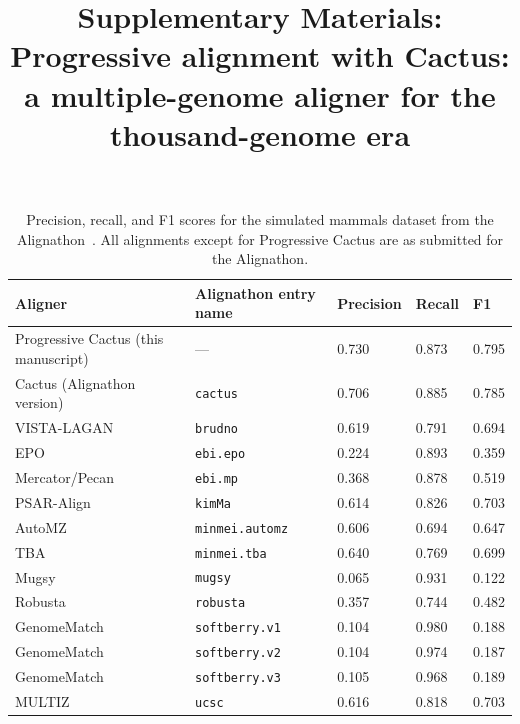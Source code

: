 \documentclass{article}
\newcommand{\beginsupplement}{%
        \setcounter{table}{0}
        \renewcommand{\thetable}{S\arabic{table}}%
        \setcounter{figure}{0}
        \renewcommand{\thefigure}{S\arabic{figure}}%
        \setcounter{algorithm}{0}
        \renewcommand{\thealgorithm}{S\arabic{algorithm}}%
        \setcounter{section}{0}
        \renewcommand{\thesection}{S\arabic{section}}%
}
\begin{document}
\beginsupplement
\title{Supplementary Materials: Progressive alignment with Cactus: a multiple-genome aligner for the thousand-genome era}
\author{}
\maketitle


\begin{table}
\begin{center}
\begin{tabular}{l|l|l|l|l}
Aligner	& Alignathon entry name & Precision	& Recall	& F1 \\
\midrule
Progressive Cactus (this manuscript) & --- & 0.730	& 0.873	& 0.795 \\
Cactus (Alignathon version) & \texttt{cactus} & 0.706	& 0.885	& 0.785 \\
VISTA-LAGAN~\cite{vistaLagan} & \texttt{brudno}	& 0.619	& 0.791	& 0.694\\
EPO~\cite{enredoPecan} & \texttt{ebi.epo} &	0.224 &	0.893 &	0.359 \\
Mercator/Pecan~\cite{mercator,pecan} & \texttt{ebi.mp} &	0.368 &	0.878 &	0.519 \\
PSAR-Align~\cite{psarAlign} & \texttt{kimMa}	& 0.614	& 0.826	& 0.703 \\
AutoMZ~\cite{tba} & \texttt{minmei.automz}	& 0.606	& 0.694	& 0.647 \\
TBA~\cite{tba} & \texttt{minmei.tba}	& 0.640	& 0.769	& 0.699 \\
Mugsy~\cite{mugsy} & \texttt{mugsy}	& 0.065	& 0.931	& 0.122 \\
Robusta~\cite{robusta} & \texttt{robusta}	& 0.357	& 0.744	& 0.482 \\
GenomeMatch & \texttt{softberry.v1}	& 0.104	& 0.980	& 0.188 \\
GenomeMatch & \texttt{softberry.v2}	& 0.104	& 0.974	& 0.187 \\
GenomeMatch & \texttt{softberry.v3}	& 0.105	& 0.968	& 0.189 \\
MULTIZ~\cite{tba} & \texttt{ucsc}	& 0.616	& 0.818	& 0.703 \\
\end{tabular}
\caption{Precision, recall, and F1 scores for the simulated mammals dataset from the Alignathon~\cite{earl2014alignathon}. All alignments except for Progressive Cactus are as submitted for the Alignathon.}\label{tab:alignathonMammals}
\end{center}
\end{table}
\end{document}
